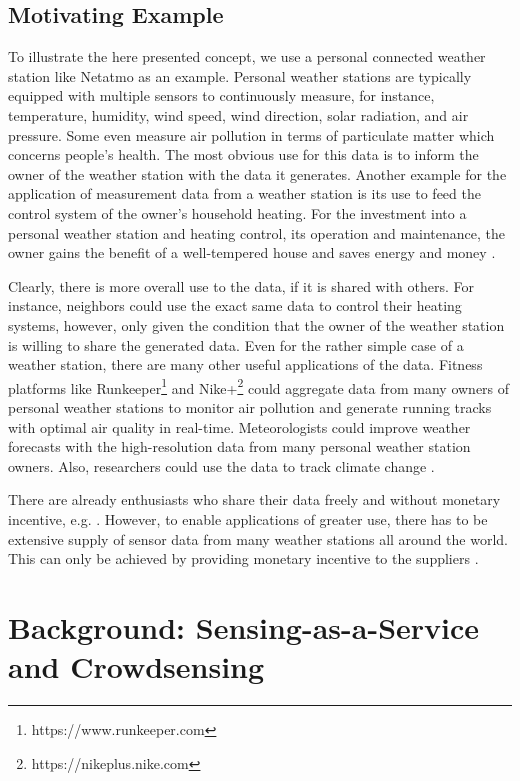 \subsection{Motivating Example}

To illustrate the here presented concept, we use a personal connected weather station like Netatmo \parencite{netatmo} as an example. Personal weather stations are typically equipped with multiple sensors to continuously measure, for instance, temperature, humidity, wind speed, wind direction, solar radiation, and air pressure. Some even measure air pollution in terms of particulate matter which concerns people's health. The most obvious use for this data is to inform the owner of the weather station with the data it generates. Another example for the application of measurement data from a weather station is its use to feed the control system of the owner's household heating. For the investment into a personal weather station and heating control, its operation and maintenance, the owner gains the benefit of a well-tempered house and saves energy and money \parencite{dong2014real}. 

Clearly, there is more overall use to the data, if it is shared with others. For instance, neighbors could use the exact same data to control their heating systems, however, only given the condition that the owner of the weather station is willing to share the generated data. Even for the rather simple case of a weather station, there are many other useful applications of the data. Fitness platforms like Runkeeper\footnote{https://www.runkeeper.com} and Nike+\footnote{https://nikeplus.nike.com} could aggregate data from many owners of personal weather stations to monitor air pollution and generate running tracks with optimal air quality in real-time. Meteorologists could improve weather forecasts with the high-resolution data from many personal weather station owners. Also, researchers could use the data to track climate change \parencite{JOC:JOC1276}.

There are already enthusiasts who share their data freely and without monetary incentive, e.g. \parencite{wunderground.com}. However, to enable applications of greater use, there has to be extensive supply of sensor data from many weather stations all around the world. This can only be achieved by providing monetary incentive to the suppliers \parencite{bohli2009initial}.

\section{Background: Sensing-as-a-Service and Crowdsensing}
\label{sec:s2aas_background}

